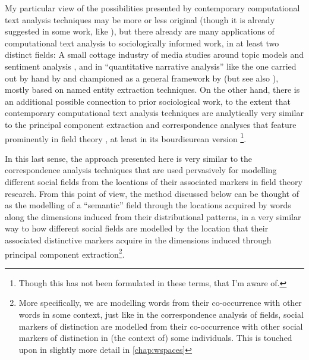 My particular view of the possibilities presented by contemporary computational text analysis techniques may be more or less original (though it is already suggested in some work, like \citet{rule2015}), but there already are many applications of computational text analysis to sociologically informed work, in at least two distinct fields:
A small cottage industry of media studies around topic models and sentiment analysis %
, and in ``quantitative narrative analysis'' like the one carried out by hand by \citet{griffin1992,griffin1993} and championed as a general framework by \citet{franzosi2004} (but see also \citet{franzosi1987,franzosi1989}), mostly based on named entity extraction techniques.
On the other hand, there is an additional possible connection to prior sociological work, to the extent that contemporary computational text analysis techniques are analytically very similar to the principal component extraction and correspondence analyses that feature prominently in field theory \citep{martin2003}, at least in its bourdieurean version \citep{bourdieu1984}\footnote{
    Though this has not been formulated in these terms, that I'm aware of.
}.

In this last sense, the approach presented here is very similar to the correspondence analysis techniques that are used pervasively for modelling different social fields from the locations of their associated markers in field theory research.
From this point of view, the method discussed below can be thought of as the modelling of a ``semantic'' field through the locations acquired by words along the dimensions induced from their distributional patterns, in a very similar way to how different social fields are modelled by the location that their associated distinctive markers acquire in the dimensions induced through principal component extraction\footnote{
    More specifically, we are modelling words from their co-occurrence with other words in some context, just like in the correspondence analysis of fields, social markers of distinction are modelled from their co-occurrence with other social markers of distinction in (the context of) some individuals.
    This is touched upon in slightly more detail in \autoref{chap:wspaces} %
}.

